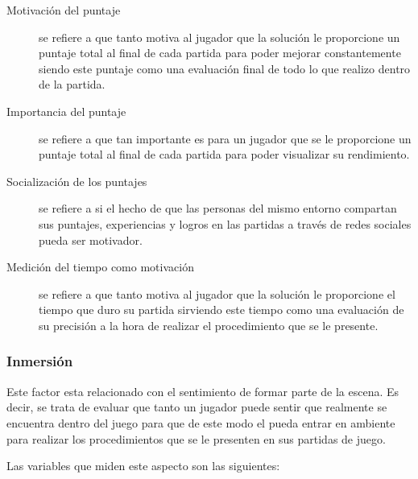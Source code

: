 \begin{description}

\item[Motivación del puntaje] se refiere a que tanto motiva al jugador que la
    solución le proporcione un puntaje total al final de cada partida para poder
    mejorar constantemente siendo este puntaje como una evaluación final de todo
    lo que realizo dentro de la partida.

\item[Importancia del puntaje] se refiere a que tan importante es para un
    jugador que se le proporcione un puntaje total al final de cada partida para
    poder visualizar su rendimiento.

\item[Socialización de los puntajes] se refiere a si el hecho de que las
    personas del mismo entorno compartan sus puntajes, experiencias y logros en
    las partidas a través de redes sociales pueda ser motivador.

\item[Medición del tiempo como motivación] se refiere a que tanto motiva al
    jugador que la solución le proporcione el tiempo que duro su partida
    sirviendo este tiempo como una evaluación de su precisión a la hora de
    realizar el procedimiento que se le presente.

\end{description} 


\subsubsection{Inmersión}
\label{sec:sub_inmersion}

Este factor esta relacionado con el sentimiento de formar parte de la escena. Es
decir, se trata de evaluar que tanto un jugador puede sentir que realmente se
encuentra dentro del juego para que de este modo el pueda entrar en ambiente
para realizar los procedimientos que se le presenten en sus partidas de juego.

Las variables que miden este aspecto son las siguientes:

